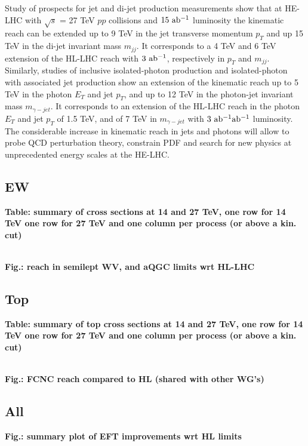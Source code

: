 \documentclass{article}
\begin{document}
Study of prospects for jet and di-jet production measurements show that at HE-LHC with $\sqrt{s}$ = 27 TeV $pp$ collisions and $15~ {\rm ab^{-1}}$ luminosity the kinematic reach can be extended up to 9 TeV in the jet transverse momentum $p_T$ and up 15 TeV in the di-jet invariant mass $m_{jj}$. It corresponds to a 4 TeV and 6 TeV extension of the HL-LHC reach with $3~ {\rm ab^{-1}}$, respectively in $p_T$ and $m_{jj}$. Similarly, studies of inclusive isolated-photon production and isolated-photon with associated jet production show an extension of the kinematic reach up to 5 TeV in the photon $E_T$ and jet $p_T$, and up to 12 TeV in the photon-jet invariant mass $m_{\gamma - jet}$. It corresponds to an extension of the HL-LHC reach in the photon $E_T$ and jet $p_T$ of 1.5 TeV, and of 7 TeV in $m_{\gamma - jet}$ with $3 ~{\rm ab^{-1}}{\rm ab^{-1}}$ luminosity.
The considerable increase in kinematic reach in jets and photons will allow to probe QCD perturbation theory, constrain PDF and search for new physics at unprecedented energy scales at the HE-LHC.
\subsection{EW}

{\bf Table: summary of cross sections at 14 and 27 TeV, one row for 14 TeV one row for 27 TeV and one column per process (or above a kin. cut) }



\\
{\bf Fig.: reach in semilept WV, and aQGC limits wrt HL-LHC}



\subsection{Top}

{\bf Table: summary of top cross sections at 14 and 27 TeV, one row for 14 TeV one row for 27 TeV and one column per process (or above a kin. cut) }



\\
{\bf Fig.: FCNC reach compared to HL (shared with other WG's)}


\subsection{All}

{\bf Fig.: summary plot of EFT improvements wrt HL limits}


{}
\end{document}
